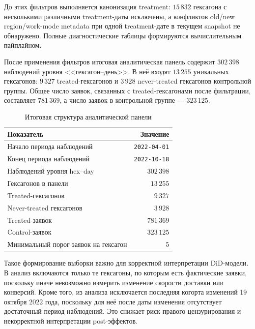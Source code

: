 \documentclass[14pt,a4paper]{extarticle}
\begin{document}
До этих фильтров выполняется канонизация treatment: \(15\,832\) гексагона с несколькими различными treatment-даты исключены, а конфликтов old/new region/work-mode metadata при одной treatment-дате в текущем snapshot не обнаружено. Полные диагностические таблицы формируются вычислительным пайплайном.

После применения фильтров итоговая аналитическая панель содержит \(302\,398\) наблюдений уровня <<гексагон--день>>. В неё входят \(13\,255\) уникальных гексагонов: \(9\,327\) treated-гексагонов и \(3\,928\) never-treated гексагонов контрольной группы. Общее число заявок, связанных с treated-гексагонами после фильтрации, составляет \(781\,369\), а число заявок в контрольной группе --- \(323\,125\).

\begin{table}[H]
    \centering
    \caption{Итоговая структура аналитической панели}
    \label{tab:analysis_panel_summary}
    \small
    \begin{tabular}{lr}
        \toprule
        Показатель & Значение \\
        \midrule
        Начало периода наблюдений & \texttt{2022-04-01} \\
        Конец периода наблюдений & \texttt{2022-10-18} \\
        Наблюдений уровня hex--day & \(302\,398\) \\
        Гексагонов в панели & \(13\,255\) \\
        Treated-гексагонов & \(9\,327\) \\
        Never-treated гексагонов & \(3\,928\) \\
        Treated-заявок & \(781\,369\) \\
        Control-заявок & \(323\,125\) \\
        Минимальный порог заявок на гексагон & \(5\) \\
        \bottomrule
    \end{tabular}
\end{table}

Такое формирование выборки важно для корректной интерпретации DiD-модели. В анализ включаются только те гексагоны, по которым есть фактические заявки, поскольку иначе невозможно измерить изменение скорости доставки или конверсий. Кроме того, из анализа исключается последняя когорта изменений 19 октября 2022 года, поскольку для неё после даты изменения отсутствует достаточный период наблюдений. Это снижает риск правого цензурирования и некорректной интерпретации post-эффектов.
\end{document}
